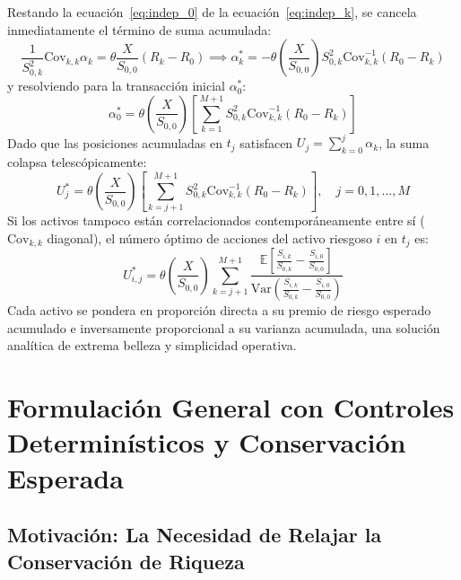 \documentclass[11pt,a4paper]{report}
\numberwithin{equation}{chapter}
\begin{document}
Restando la ecuación~\eqref{eq:indep_0} de la ecuación~\eqref{eq:indep_k}, se cancela inmediatamente el término de suma acumulada:
\begin{equation}
    \frac{1}{S_{0,k}^2} \mathrm{Cov}_{k,k} \alpha_k = \theta \frac{X}{S_{0,0}} (R_k - R_0) \implies \boxed{\alpha_k^* = -\theta \left( \frac{X}{S_{0,0}} \right) S_{0,k}^2 \mathrm{Cov}_{k,k}^{-1} (R_0 - R_k)}
\end{equation}
y resolviendo para la transacción inicial $\alpha_0^*$:
\begin{equation}
    \boxed{\alpha_0^* = \theta \left( \frac{X}{S_{0,0}} \right) \left[ \sum_{k=1}^{M+1} S_{0,k}^2 \mathrm{Cov}_{k,k}^{-1} (R_0 - R_k) \right]}
\end{equation}
Dado que las posiciones acumuladas en $t_j$ satisfacen $U_j = \sum_{k=0}^j \alpha_k$, la suma colapsa telescópicamente:
\begin{equation}
    \boxed{U_j^* = \theta \left( \frac{X}{S_{0,0}} \right) \left[ \sum_{k=j+1}^{M+1} S_{0,k}^2 \mathrm{Cov}_{k,k}^{-1} (R_0 - R_k) \right], \quad j = 0, 1, \dots, M}
\end{equation}
Si los activos tampoco están correlacionados contemporáneamente entre sí ($\mathrm{Cov}_{k,k}$ diagonal), el número óptimo de acciones del activo riesgoso $i$ en $t_j$ es:
\begin{equation}
    \boxed{U_{i,j}^* = \theta \left( \frac{X}{S_{0,0}} \right) \sum_{k=j+1}^{M+1} \frac{\mathbb{E}\left[ \frac{S_{i,k}}{S_{0,k}} - \frac{S_{i,0}}{S_{0,0}} \right]}{\mathrm{Var}\left( \frac{S_{i,k}}{S_{0,k}} - \frac{S_{i,0}}{S_{0,0}} \right)}}
\end{equation}
Cada activo se pondera en proporción directa a su premio de riesgo esperado acumulado e inversamente proporcional a su varianza acumulada, una solución analítica de extrema belleza y simplicidad operativa.

\chapter{Formulación General con Controles Determinísticos y Conservación Esperada}

\section{Motivación: La Necesidad de Relajar la Conservación de Riqueza}
\end{document}
